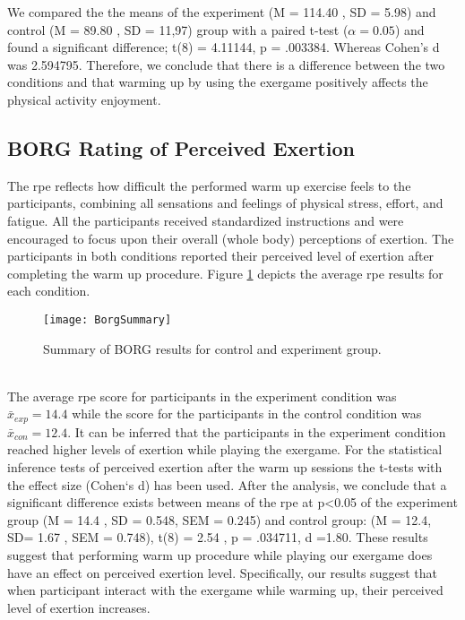 We compared the the means of the experiment (M = 114.40 , SD = 5.98) and control (M = 89.80 , SD = 11,97) group with a paired t-test (\begin{math}\alpha = 0.05\end{math}) and found a significant difference; t(8) = 4.11144, p = .003384. Whereas Cohen's d was 2.594795. Therefore, we conclude that there is a difference between the two conditions and that warming up by using the exergame positively affects the physical activity enjoyment.
\subsection{BORG Rating of Perceived Exertion}
The \acrfull{rpe} reflects how difficult the performed warm up exercise feels to the participants, combining all sensations and feelings of physical stress, effort, and fatigue. All the participants received standardized instructions and were encouraged to focus upon their overall (whole body) perceptions of exertion. The participants in both conditions reported their perceived level of exertion after completing the warm up procedure.  Figure \ref{fig:borg} depicts the average \gls{rpe}  results for each condition.\\
\begin{figure}[h]
    \centering
    \texttt{[image: BorgSummary]}
    \caption{Summary of BORG results for control and experiment group.}
    \label{fig:borg}
\end{figure}\\
The average \gls{rpe} score for participants in the experiment condition was   \begin{math}\bar{x}_{exp} = 14.4 \end{math} while the score for the participants in the control condition was   \begin{math}\bar{x}_{con} = 12.4 \end{math}. It can be inferred that the participants in the experiment condition reached higher levels of exertion while playing the exergame. For the statistical inference tests of perceived exertion after the warm up sessions the t-tests with the effect size (Cohen`s d) has been used. After the analysis, we conclude that a significant difference exists  between means of the \gls{rpe}  at p\textless 0.05 of the experiment group (M = 14.4 , SD = 0.548, SEM = 0.245) and control group: (M = 12.4, SD= 1.67 , SEM = 0.748), t(8) = 2.54 , p = .034711, d =1.80.  These results suggest that performing warm up procedure while playing our exergame does have an effect on perceived exertion level. Specifically, our results suggest that when participant interact with the exergame while warming up, their perceived level of exertion increases.
